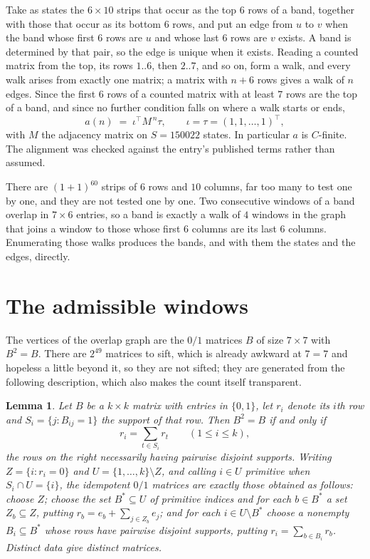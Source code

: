 \documentclass[11pt,a4paper]{article}
\theoremstyle{plain}
\newtheorem{lemma}[theorem]{Lemma}
\theoremstyle{definition}
\begin{document}
Take as states the $6\times10$ strips that occur as the top $6$ rows of a band,
together with those that occur as its bottom $6$ rows, and put an edge from $u$ to $v$
when the band whose first $6$ rows are $u$ and whose last $6$ rows are $v$ exists.
A band is determined by that pair, so the edge is unique when it exists. Reading a counted
matrix from the top, its rows $1..6$, then $2..7$, and so on, form a walk, and every
walk arises from exactly one matrix; a matrix with $n+6$ rows gives a walk of $n$ edges.
Since the first $6$ rows of a counted matrix with at least $7$ rows are the top of a
band, and since no further condition falls on where a walk starts or ends,
\[
a(n)\;=\;\iota^{\!\top}M^{\,n}\tau ,\qquad \iota=\tau=(1,1,\dots,1)^{\!\top},
\]
with $M$ the adjacency matrix on $S=150022$ states. In particular $a$ is $C$-finite. The
alignment was checked against the entry's published terms rather than assumed.

There are $(1 + 1)^{60}$ strips of $6$ rows and $10$ columns, far too
many to test one by one, and they are not tested one by one. Two consecutive windows of a band
overlap in $7\times6$ entries, so a band is exactly a walk of $4$ windows in
the graph that joins a window to those whose first $6$ columns are its last $6$
columns. Enumerating those walks produces the bands, and with them the states and the edges,
directly.

\section{The admissible windows}

The vertices of the overlap graph are the $0/1$ matrices $B$ of size $7\times7$ with
$B^2=B$. There are $2^{49}$ matrices to sift, which is already awkward at $7=7$ and
hopeless a little beyond it, so they are not sifted; they are generated from the following
description, which also makes the count itself transparent.

\begin{lemma}\label{lem:idem}
Let $B$ be a $k\times k$ matrix with entries in $\{0,1\}$, let $r_i$ denote its $i$th row and
$S_i=\{j:B_{ij}=1\}$ the support of that row. Then $B^2=B$ if and only if
\[
r_i=\sum_{t\in S_i}r_t \qquad (1\le i\le k),
\]
the rows on the right necessarily having pairwise disjoint supports. Writing
$Z=\{i:r_i=0\}$ and $U=\{1,\dots,k\}\setminus Z$, and calling $i\in U$ \emph{primitive}
when $S_i\cap U=\{i\}$, the idempotent $0/1$ matrices are exactly those obtained as follows:
choose $Z$; choose the set $B^{\ast}\subseteq U$ of primitive indices and for each
$b\in B^{\ast}$ a set $Z_b\subseteq Z$, putting $r_b=e_b+\sum_{j\in Z_b}e_j$; and for each
$i\in U\setminus B^{\ast}$ choose a nonempty $B_i\subseteq B^{\ast}$ whose rows have
pairwise disjoint supports, putting $r_i=\sum_{b\in B_i}r_b$. Distinct data give distinct
matrices.
\end{lemma}
\end{document}
